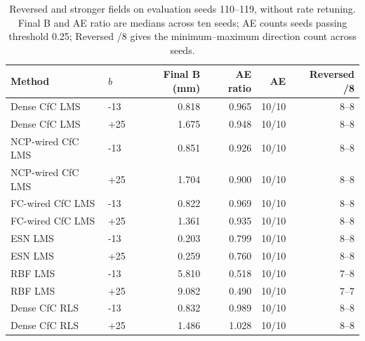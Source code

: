 \begin{table}[t]
\centering\small
\caption{Reversed and stronger fields on evaluation seeds 110--119, without rate retuning. Final B and AE ratio are medians across ten seeds; AE counts seeds passing threshold 0.25; Reversed /8 gives the minimum--maximum direction count across seeds.}
\label{tab:revision-aux}
\begin{tabular}{llrrrr}
\toprule
Method & $b$ & Final B (mm) & AE ratio & AE & Reversed /8 \\
\midrule
Dense CfC LMS & -13 & 0.818 & 0.965 & 10/10 & 8--8 \\
Dense CfC LMS & +25 & 1.675 & 0.948 & 10/10 & 8--8 \\
NCP-wired CfC LMS & -13 & 0.851 & 0.926 & 10/10 & 8--8 \\
NCP-wired CfC LMS & +25 & 1.704 & 0.900 & 10/10 & 8--8 \\
FC-wired CfC LMS & -13 & 0.822 & 0.969 & 10/10 & 8--8 \\
FC-wired CfC LMS & +25 & 1.361 & 0.935 & 10/10 & 8--8 \\
ESN LMS & -13 & 0.203 & 0.799 & 10/10 & 8--8 \\
ESN LMS & +25 & 0.259 & 0.760 & 10/10 & 8--8 \\
RBF LMS & -13 & 5.810 & 0.518 & 10/10 & 7--8 \\
RBF LMS & +25 & 9.082 & 0.490 & 10/10 & 7--7 \\
Dense CfC RLS & -13 & 0.832 & 0.989 & 10/10 & 8--8 \\
Dense CfC RLS & +25 & 1.486 & 1.028 & 10/10 & 8--8 \\
\bottomrule\end{tabular}
\end{table}
